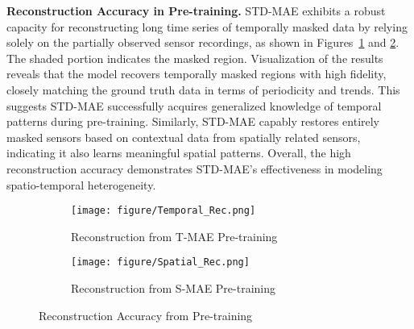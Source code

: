 \documentclass[letterpaper]{article} \usepackage{aaai24}  \usepackage{times}  \usepackage{helvet}  \usepackage{courier}  \usepackage[hyphens]{url}  \usepackage{graphicx} \urlstyle{rm} \def\UrlFont{\rm}  \usepackage{natbib}  \usepackage{caption} \frenchspacing  \setlength{\pdfpagewidth}{8.5in} \setlength{\pdfpageheight}{11in} \usepackage{algorithm}
\begin{document}
\noindent\textbf{Reconstruction Accuracy in Pre-training.} STD-MAE exhibits a robust capacity for reconstructing long time series of temporally masked data by relying solely on the partially observed sensor recordings, as shown in Figures~\ref{case1-subfig1} and \ref{case1-subfig2}. The shaded portion indicates the masked region. Visualization of the results reveals that the model recovers temporally masked regions with high fidelity, closely matching the ground truth data in terms of periodicity and trends. This suggests STD-MAE successfully acquires generalized knowledge of temporal patterns during pre-training. Similarly, STD-MAE capably restores entirely masked sensors based on contextual data from spatially related sensors, indicating it also learns meaningful spatial patterns. Overall, the high reconstruction accuracy demonstrates STD-MAE's effectiveness in modeling spatio-temporal heterogeneity.
\begin{figure}[h]
  \captionsetup{justification=centering}
  \centering
  
  \begin{subfigure}{0.45\textwidth}
    \texttt{[image: figure/Temporal\_Rec.png]}
\caption{Reconstruction from T-MAE Pre-training}
    \label{case1-subfig1}
  \end{subfigure}
  
  \begin{subfigure}{0.45\textwidth}
    \texttt{[image: figure/Spatial\_Rec.png]}
\caption{Reconstruction from S-MAE Pre-training}

    \label{case1-subfig2}
  \end{subfigure}
  
  \captionsetup{justification=centering}
  \caption{Reconstruction Accuracy from Pre-training}
\label{fig:case1}
\end{figure}
\end{document}
